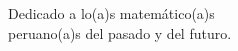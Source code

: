 \begin{dedication}
    Dedicado a lo(a)s matemático(a)s \\
    peruano(a)s del pasado y del futuro.
\end{dedication}